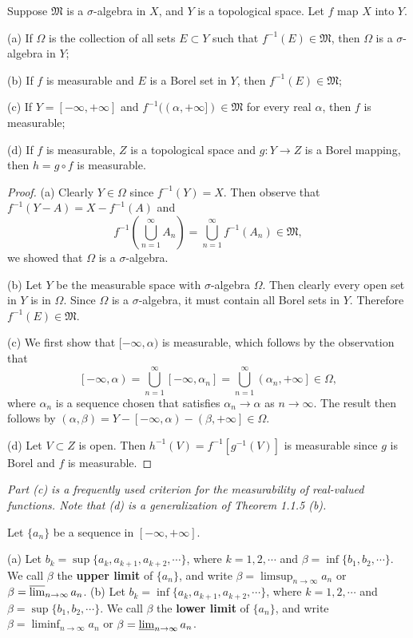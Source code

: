 \begin{theorem}
Suppose $\mathfrak{M}$ is a $\sigma$-algebra in $X$, and $Y$ is a topological space. Let $f$ map $X$ into $Y$.\par
(a) If $\Omega$ is the collection of all sets $E\subset Y$ such that $f^{-1}(E)\in\mathfrak{M}$, then $\Omega$ is a $\sigma$-algebra in $Y$;\par
(b) If $f$ is measurable and $E$ is a Borel set in $Y$, then $f^{-1}(E)\in\mathfrak{M}$;\par
(c) If $Y=[-\infty,+\infty]$ and $f^{-1}((\alpha,+\infty])\in\mathfrak{M}$ for every real $\alpha$, then $f$ is measurable;\par
(d) If $f$ is measurable, $Z$ is a topological space and $g:Y\to Z$ is a Borel mapping, then $h=g\circ f$ is measurable.
\end{theorem}
\begin{proof}
(a) Clearly $Y\in\Omega$ since $f^{-1}(Y)=X$. Then observe that $f^{-1}(Y-A)=X-f^{-1}(A)$ and 
$$f^{-1}\left( \bigcup_{n=1}^{\infty}{A_n} \right) =\bigcup_{n=1}^{\infty}{f^{-1}\left( A_n \right)}\in \mathfrak{M},$$
we showed that $\Omega$ is a $\sigma$-algebra.\par
(b) Let $Y$ be the measurable space with $\sigma$-algebra $\Omega$. Then clearly every open set in $Y$ is in $\Omega$. Since $\Omega$ is a $\sigma$-algebra, it must contain all Borel sets in $Y$. Therefore $f^{-1}(E)\in\mathfrak{M}$.\par
(c) We first show that $[-\infty,\alpha)$ is measurable, which follows by the observation that 
$$
\left[ -\infty ,\alpha \right) =\bigcup_{n=1}^{\infty}{\left[ -\infty ,\alpha _n \right]}=\bigcup_{n=1}^{\infty}{\left( \alpha _n,+\infty \right]}\in \Omega ,
$$
where $\alpha_n$ is a sequence chosen that satisfies $\alpha_n\to\alpha$ as $n\to\infty$. The result then follows by $\left( \alpha ,\beta \right) =Y-\left[ -\infty ,\alpha \right) -\left( \beta ,+\infty \right] \in \Omega $.\par
(d) Let $V\subset Z$ is open. Then $h^{-1}\left( V \right) =f^{-1}\left[ g^{-1}\left( V \right) \right] $ is measurable since $g$ is Borel and $f$ is measurable.
\end{proof}
\begin{note}\em
Part (c) is a frequently used criterion for the measurability of real-valued functions. Note that (d) is a generalization of Theorem 1.1.5 (b).
\end{note}
\begin{definition}
Let $\{a_n\}$ be a sequence in $[-\infty,+\infty]$.\par
(a) Let $b_k=\sup\{a_k,a_{k+1},a_{k+2},\cdots\}$, where $k=1,2,\cdots$ and $\beta=\inf\{b_1,b_2,\cdots\}$. We call $\beta$ the \textbf{upper limit} of $\{a_n\}$, and write $\beta=\limsup_{n\to\infty}a_n$ or $\beta=\varlimsup_{n\to\infty}a_n$.
(b) Let $b_k=\inf\{a_k,a_{k+1},a_{k+2},\cdots\}$, where $k=1,2,\cdots$ and $\beta=\sup\{b_1,b_2,\cdots\}$. We call $\beta$ the \textbf{lower limit} of $\{a_n\}$, and write $\beta=\liminf_{n\to\infty}a_n$ or $\beta=\varliminf_{n\to\infty}a_n$.
\end{definition}
